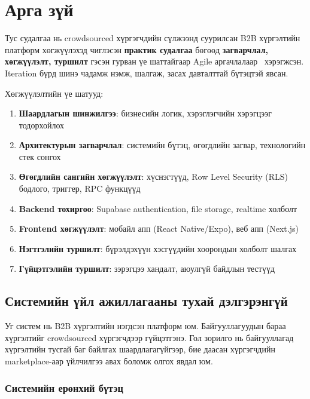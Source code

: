 \section{Арга зүй}
\label{sec:methodology}

Тус судалгаа нь crowdsourced хүргэгчдийн сүлжээнд суурилсан B2B хүргэлтийн платформ хөгжүүлэхэд чиглэсэн \textbf{практик судалгаа} бөгөөд \textbf{загварчлал, хөгжүүлэлт, туршилт} гэсэн гурван үе шаттайгаар Agile аргачлалаар~\cite{agile2001manifesto} хэрэгжсэн. Iteration бүрд шинэ чадамж нэмж, шалгаж, засах давталттай бүтэцтэй явсан.

Хөгжүүлэлтийн үе шатууд:
\begin{enumerate}
  \item \textbf{Шаардлагын шинжилгээ}: бизнесийн логик, хэрэглэгчийн хэрэгцээг тодорхойлох
  \item \textbf{Архитектурын загварчлал}: системийн бүтэц, өгөгдлийн загвар, технологийн стек сонгох
  \item \textbf{Өгөгдлийн сангийн хөгжүүлэлт}: хүснэгтүүд, Row Level Security (RLS) бодлого, триггер, RPC функцүүд
  \item \textbf{Backend тохиргоо}: Supabase authentication, file storage, realtime холболт
  \item \textbf{Frontend хөгжүүлэлт}: мобайл апп (React Native/Expo), веб апп (Next.js)
  \item \textbf{Нэгтгэлийн туршилт}: бүрэлдэхүүн хэсгүүдийн хоорондын холболт шалгах
  \item \textbf{Гүйцэтгэлийн туршилт}: зэрэгцээ хандалт, аюулгүй байдлын тестүүд
\end{enumerate}

\subsection{Системийн үйл ажиллагааны тухай дэлгэрэнгүй}
\label{subsec:system_overview}

Уг систем нь B2B хүргэлтийн нэгдсэн платформ юм. Байгууллагуудын бараа хүргэлтийг crowdsourced хүргэгчдээр гүйцэтгэнэ. Гол зорилго нь байгууллагад хүргэлтийн тусгай баг байлгах шаардлагагүйгээр, бие даасан хүргэгчдийн marketplace-аар үйлчилгээ авах боломж олгох явдал юм.

\subsubsection{Системийн ерөнхий бүтэц}

